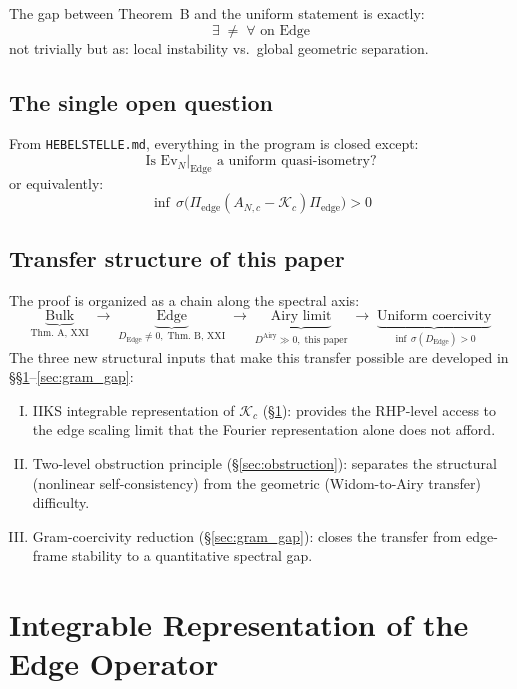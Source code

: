 \documentclass[12pt,a4paper]{amsart}
\theoremstyle{definition}
\newcommand{\Kop}{\mathcal{K}_c}
\newcommand{\Pedge}{\Pi_{\mathrm{edge}}}
\newcommand{\Ev}{\mathrm{Ev}_N}
\newcommand{\AN}{A_{N,c}}
\newcommand{\Dedge}{D_{\mathrm{Edge}}}
\begin{document}
The gap between Theorem~B and the uniform statement is exactly:
\[
  \boxed{\exists \;\ne\; \forall \text{ on Edge}}
\]
not trivially but as: local instability vs.\ global geometric separation.

\subsection{The single open question}

From \texttt{HEBELSTELLE.md}, everything in the program is closed
except:
\[
  \text{Is } \Ev|_{\mathrm{Edge}} \text{ a uniform quasi-isometry?}
\]
or equivalently:
\[
  \boxed{\inf\,\sigma\bigl(\Pedge(\AN - \Kop)\Pedge\bigr) > 0}
\]

\subsection{Transfer structure of this paper}

The proof is organized as a chain along the spectral axis:
\[
  \underbrace{\text{Bulk}}_{\text{Thm.~A, XXI}}
  \;\longrightarrow\;
  \underbrace{\text{Edge}}_{\Dedge \ne 0,\;\text{Thm.~B, XXI}}
  \;\longrightarrow\;
  \underbrace{\text{Airy limit}}_{D^{\mathrm{Airy}} \gg 0,\;\text{this paper}}
  \;\longrightarrow\;
  \underbrace{\text{Uniform coercivity}}_{\inf\,\sigma(\Dedge) > 0}
\]
The three new structural inputs that make this transfer possible
are developed in \S\S\ref{sec:iiks}--\ref{sec:gram_gap}:
\begin{enumerate}[(I)]
  \item IIKS integrable representation of $\Kop$
  (\S\ref{sec:iiks}): provides the RHP-level access
  to the edge scaling limit that the Fourier representation alone
  does not afford.
  \item Two-level obstruction principle
  (\S\ref{sec:obstruction}): separates the structural
  (nonlinear self-consistency) from the geometric
  (Widom-to-Airy transfer) difficulty.
  \item Gram-coercivity reduction
  (\S\ref{sec:gram_gap}): closes the transfer from
  edge-frame stability to a quantitative spectral gap.
\end{enumerate}

\section{Integrable Representation of the Edge Operator}%
\label{sec:iiks}
\end{document}
